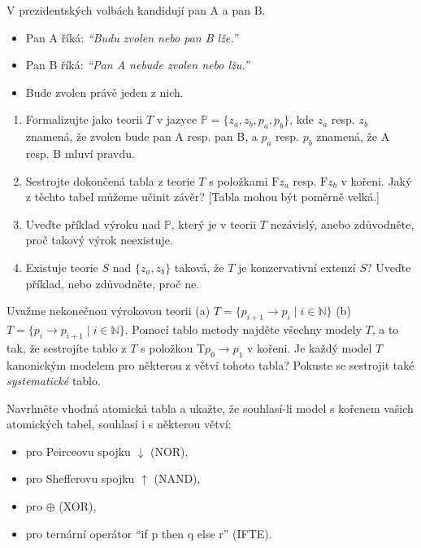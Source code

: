\documentclass[a4paper,12pt]{article}
\begin{document}
    
    \medskip\begin{problem} %
    V prezidentských volbách kandidují pan A a pan B.
    \begin{itemize}
    \item Pan A říká: {\it ``Budu zvolen nebo pan B lže.''}
    \item Pan B říká: {\it ``Pan A nebude zvolen nebo lžu.''}
    \item Bude zvolen právě jeden z nich.
    \end{itemize}
    \begin{enumerate}
    \item Formalizujte jako teorii $T$ v jazyce $\mathbb P=\{z_a,z_b,p_a,p_b\}$, kde $z_a$ resp. $z_b$ znamená, že zvolen bude pan A resp. pan B, a $p_a$ resp. $p_b$ znamená, že A resp. B mluví pravdu.
    \item Sestrojte dokončená tabla z teorie $T$ s položkami $\mathrm{F}z_a$ resp. $\mathrm{F}z_b$ v kořeni. Jaký z těchto tabel můžeme učinit závěr? [Tabla mohou být poměrně velká.]
    \item Uveďte příklad výroku nad $\mathbb{P}$, který je v teorii $T$ nezávislý, anebo zdůvodněte, proč takový výrok neexistuje.
    \item Existuje teorie $S$ nad $\{z_a,z_b\}$ taková, že $T$ je konzervativní extenzí $S$? Uveďte příklad, nebo zdůvodněte, proč ne.
    \end{enumerate}
\end{problem}


\medskip\begin{problem}
    Uvažme nekonečnou výrokovou teorii (a) $T=\{p_{i+1} \to p_i\mid i\in \mathbb{N}\}$ (b) $T=\{p_i \to p_{i+1}\mid i\in \mathbb{N}\}$. Pomocí tablo metody najděte všechny modely $T$, a to tak, že sestrojíte tablo z $T$ s položkou $\mathrm{T}p_0\to p_1$ v kořeni. Je každý model $T$ kanonickým modelem pro některou z větví tohoto tabla? Pokuste se sestrojit také \emph{systematické} tablo.
\end{problem}


\medskip\begin{problem} 
    Navrhněte vhodná atomická tabla a ukažte, že souhlasí-li model s kořenem vašich atomických tabel, souhlasí i s některou větví:
    \begin{itemize}
        \item pro Peirceovu spojku $\downarrow$ (NOR),
        \item pro Shefferovu spojku $\uparrow$ (NAND),
        \item pro $\oplus$ (XOR),
        \item pro ternární operátor ``if p then q else r'' (IFTE).
    \end{itemize}  
    
\end{problem}
\end{document}
